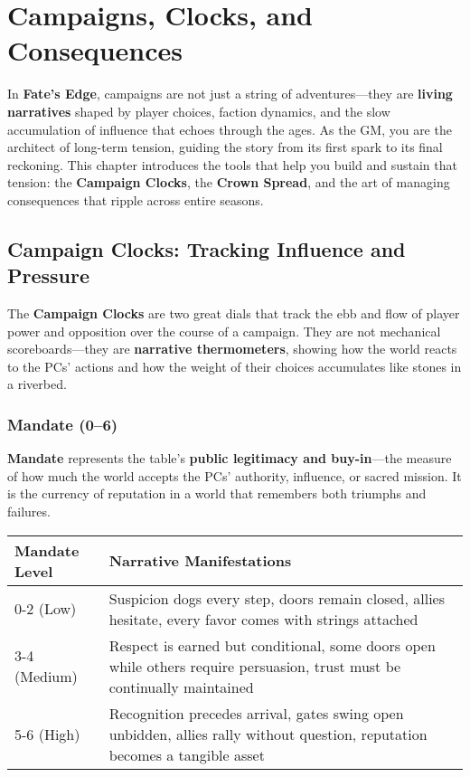 \chapter{Campaigns, Clocks, and Consequences}

In \textbf{Fate's Edge}, campaigns are not just a string of adventures---they are \textbf{living narratives} shaped by player choices, faction dynamics, and the slow accumulation of influence that echoes through the ages. As the GM, you are the architect of long-term tension, guiding the story from its first spark to its final reckoning. This chapter introduces the tools that help you build and sustain that tension: the \textbf{Campaign Clocks}, the \textbf{Crown Spread}, and the art of managing consequences that ripple across entire seasons.

\section*{Campaign Clocks: Tracking Influence and Pressure}

The \textbf{Campaign Clocks} are two great dials that track the ebb and flow of player power and opposition over the course of a campaign. They are not mechanical scoreboards---they are \textbf{narrative thermometers}, showing how the world reacts to the PCs' actions and how the weight of their choices accumulates like stones in a riverbed.

\subsection*{Mandate (0--6)}

\textbf{Mandate} represents the table's \textbf{public legitimacy and buy-in}---the measure of how much the world accepts the PCs' authority, influence, or sacred mission. It is the currency of reputation in a world that remembers both triumphs and failures.

\begin{fatebox}
\begin{tabularx}{\textwidth}{lX}
\toprule
\textbf{Mandate Level} & \textbf{Narrative Manifestations} \\
\midrule
0-2 (Low) & Suspicion dogs every step, doors remain closed, allies hesitate, every favor comes with strings attached \\
3-4 (Medium) & Respect is earned but conditional, some doors open while others require persuasion, trust must be continually maintained \\
5-6 (High) & Recognition precedes arrival, gates swing open unbidden, allies rally without question, reputation becomes a tangible asset \\
\bottomrule
\end{tabularx}
\end{fatebox}

